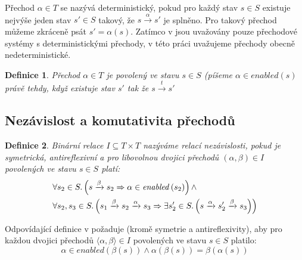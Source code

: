 \documentclass[10pt,a4paper,notitlepage]{report}
\newtheorem{definition}{Definice}
\newcommand{\tuple}[1]{\langle #1 \rangle}
\begin{document}
Přechod $\alpha \in T$ se nazývá deterministický, pokud pro každý stav $s \in S$ existuje nejvýše jeden stav $s\prime \in S$ takový, že $s \xrightarrow{\alpha} s\prime$ je splněno. Pro takový přechod můžeme zkráceně psát $s\prime = \alpha(s)$. Zatímco v \cite{CLARKE} jsou uvažovány pouze přechodové systémy s deterministickými přechody, v této práci uvažujeme přechody obecně nedeterministické.


\begin{definition}
Přechod $\alpha \in T$ je povolený ve stavu $s \in S$ (píšeme $\alpha \in \mathit{enabled}(s)$ právě tehdy, když existuje stav $s'$ tak že $s \xrightarrow{t} s'$
\end{definition}

\subsection{Nezávislost a komutativita přechodů}

\begin{definition}
Binární relace $I \subseteq T \times T$ nazýváme relací nezávislosti, pokud je symetrická, antireflexivní a pro libovolnou dvojici přechodů $(\alpha, \beta) \in I$ povolených ve stavu $s \in S$ platí:
\begin{equation}\label{eq:independent-my}
\begin{split}
&\forall s_2 \in S \ldotp
\left({
	s \xrightarrow{\beta} s_2
	\Rightarrow
	\alpha \in \mathit{enabled}\left({s_2}\right)
}\right)
\land \\
&\forall s_2, s_3 \in S \ldotp \left({
	s_1 \xrightarrow{\beta} s_2 \xrightarrow{\alpha} s_3
	\Rightarrow
	\exists s_2' \in S \ldotp \left({
		s \xrightarrow{\alpha} s_2' \xrightarrow{\beta} s_3
	}\right)
}\right)
\end{split}
\end{equation}
\end{definition}


Odpovídající definice v \cite{CLARKE} požaduje (kromě symetrie a antireflexivity), aby pro každou dvojici přechodů $\tuple{\alpha, \beta} \in I$ povolených ve stavu $s \in S $ platilo:
\begin{equation}\label{eq:independent-clarke}
\alpha \in \mathit{enabled}\left({ \beta\left({s}\right) }\right) \land
\alpha\left({\beta\left({s}\right)}\right) = \beta\left({\alpha\left({s}\right)}\right)
\end{equation}
\end{document}
